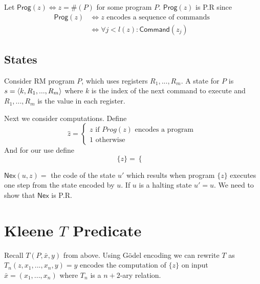 \documentclass[twoside]{article}
\def\Nex{\mathsf{Nex}}
\def\Command{\mathsf{Command}}
\def\Prog{\mathsf{Prog}}
\DeclarePairedDelimiter\anglebrac{\langle}{\rangle}
\begin{document}
Let $\Prog (z) \iff z = \# (P)$ for some program $P$. $\Prog (z)$ is P.R since 
\begin{align*}
\Prog (z) &\iff z \mbox{ encodes a sequence of commands }\\
&\iff \forall j < l(z): \Command (z_j)
\end{align*}

\subsection{States}
Consider RM program $P$, which uses registers $R_1, ..., R_m$. A state for $P$ is $s = \anglebrac{k, R_1, ..., R_m}$ where $k$ is the index of the next command to execute and $R_1, ..., R_m$ is the value in each register.

Next we consider computations. Define
\[\hat{z} = \begin{cases}
z \mbox{ if $Prog(z)$ encodes a program } \\
1 \mbox{ otherwise }
\end{cases}\]
And for our use define
\[\{z\} = \begin{cases}

\end{cases}\]

$\Nex(u,z) = $ the code of the state $u'$ which results when program $\{z\}$ executes one step from the state encoded by $u$. If $u$ is a halting state $u' = u$. We need to show that $\Nex$ is P.R.

\section{Kleene $T$ Predicate}
Recall $T(P,\bar{x},y)$ from above. Using G\"{o}del encoding we can rewrite $T$ as $T_n(z, x_1, ..., x_n, y) = y$ encodes the computation of $\{z\}$ on input $\bar{x} = (x_1, ..., x_n)$ where $T_{n}$ is a $n+2$-ary relation. 
\end{document}

